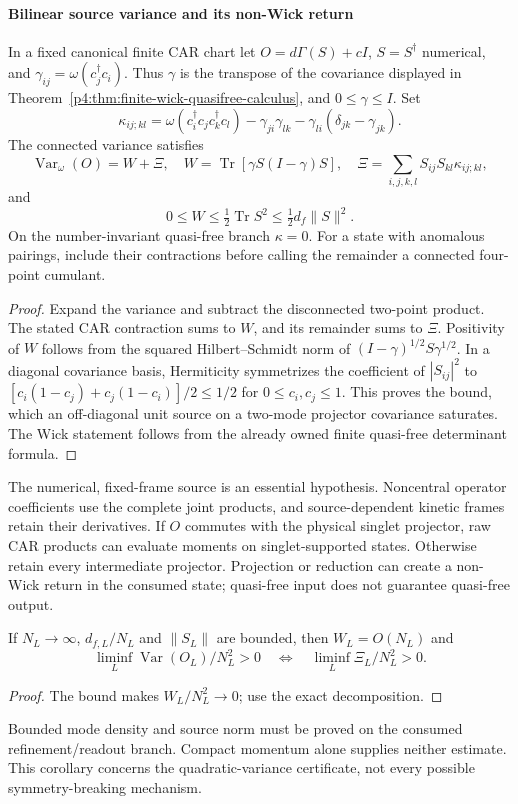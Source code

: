\documentclass[12pt,a4paper]{article}
\begin{document}
\paragraph{Bilinear source variance and its non-Wick return}
\label{p4:sec:car-source-variance}
\begin{theorem}
\label{p4:thm:car-source-variance}
In a fixed canonical finite CAR chart let $O=d\Gamma(S)+cI$,
$S=S^\dagger$ numerical, and $\gamma_{ij}=\omega(c_j^\dagger c_i)$.
Thus $\gamma$ is the transpose of the covariance displayed in
Theorem~\ref{p4:thm:finite-wick-quasifree-calculus}, and $0\le\gamma\le I$.
Set
\[
 \kappa_{ij;kl}=\omega(c_i^\dagger c_jc_k^\dagger c_l)
 -\gamma_{ji}\gamma_{lk}-\gamma_{li}(\delta_{jk}-\gamma_{jk}).
\]
The connected variance satisfies
\[
 \boxed{\operatorname{Var}_\omega(O)=W+\Xi,\quad
 W=\operatorname{Tr}[\gamma S(I-\gamma)S],\quad
 \Xi=\sum_{i,j,k,l}S_{ij}S_{kl}\kappa_{ij;kl},}
\]
and
\[
 \boxed{0\le W\le\tfrac12\operatorname{Tr}S^2
                 \le\tfrac12d_f\|S\|^2.}
\]
On the number-invariant quasi-free branch $\kappa=0$.
For a state with anomalous pairings, include their contractions before
calling the remainder a connected four-point cumulant.
\end{theorem}
\begin{proof}
Expand the variance and subtract the disconnected two-point product.
The stated CAR contraction sums to $W$, and its remainder sums to $\Xi$.
Positivity of $W$ follows from the squared Hilbert--Schmidt norm of
$(I-\gamma)^{1/2}S\gamma^{1/2}$. In a diagonal covariance basis,
Hermiticity symmetrizes the coefficient of $|S_{ij}|^2$ to
$[c_i(1-c_j)+c_j(1-c_i)]/2\le1/2$ for $0\le c_i,c_j\le1$.
This proves the bound, which an off-diagonal unit source on a two-mode
projector covariance saturates. The Wick statement follows from the
already owned finite quasi-free determinant formula.
\end{proof}
The numerical, fixed-frame source is an essential hypothesis.
Noncentral operator coefficients use the complete joint products, and
source-dependent kinetic frames retain their derivatives.
If $O$ commutes with the physical singlet projector, raw CAR products
can evaluate moments on singlet-supported states. Otherwise retain
every intermediate projector. Projection or reduction can create a
non-Wick return in the consumed state; quasi-free input does not guarantee
quasi-free output.

\begin{corollary}
\label{p4:cor:bounded-source-connected-return}
If $N_L\to\infty$, $d_{f,L}/N_L$ and $\|S_L\|$ are bounded, then
$W_L=O(N_L)$ and
\[
 \liminf_L\operatorname{Var}(O_L)/N_L^2>0
 \quad\Longleftrightarrow\quad
 \liminf_L\Xi_L/N_L^2>0.
\]
\end{corollary}
\begin{proof}
The bound makes $W_L/N_L^2\to0$; use the exact decomposition.
\end{proof}
Bounded mode density and source norm must be proved on the consumed
refinement/readout branch. Compact momentum alone supplies neither
estimate. This corollary concerns the quadratic-variance certificate,
not every possible symmetry-breaking mechanism.
\end{document}
